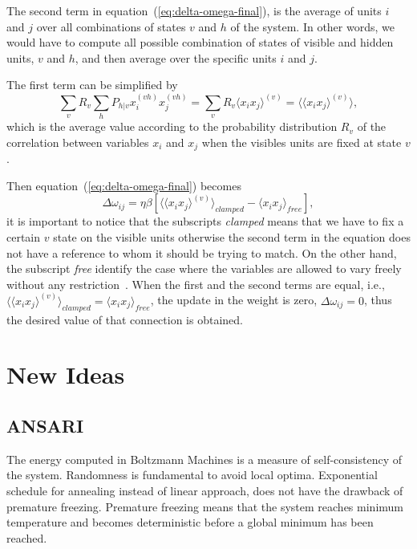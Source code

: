 The second term in equation~(\ref{eq:delta-omega-final}), is the average of units $i$ and $j$ over all combinations of states $v$ and $h$ of the system.
In other words, we would have to compute all possible combination of states of visible and hidden units, $v$ and $h$, and then average over the specific units $i$ and $j$.

The first term can be simplified by
\begin{equation}
  \label{eq:clamped-term}
  \sum_{v} R_{v} \sum_{h} P_{h|v} x^{(vh)}_{i} x^{(vh)}_{j} = \sum_{v} R_{v} \langle x_{i} x_{j} \rangle^{(v)} = \langle \langle x_{i} x_{j} \rangle^{(v)} \rangle,
\end{equation}
which is the average value according to the probability distribution $R_{v}$ of the correlation between variables $x_{i}$ and $x_{j}$ when the visibles units are fixed at state $v$.

Then equation~(\ref{eq:delta-omega-final}) becomes
\begin{equation}
  \label{eq:delta-omega-final2}
  \Delta \omega_{ij} = \eta \beta \left[ \langle \langle x_{i} x_{j} \rangle^{(v)} \rangle_{clamped} - \langle x_{i} x_{j} \rangle_{free} \right],
\end{equation}
it is important to notice that the subscripts \textit{clamped} means that we have to fix a certain $v$ state on the visible units otherwise the second term in the equation does not have a reference to whom it should be trying to match.
On the other hand, the subscript \textit{free} identify the case where the variables are allowed to vary freely without any restriction~\cite{bib:duda2000}. When the first and the second terms are equal, i.e., $\langle \langle x_{i} x_{j} \rangle^{(v)} \rangle_{clamped} = \langle x_{i} x_{j} \rangle_{free}$, the update in the weight is zero, $\Delta \omega_{ij} = 0$, thus the desired value of that connection is obtained.



\section{New Ideas}
\subsection{ANSARI}

The energy computed in Boltzmann Machines is a measure of self-consistency of the system. 
Randomness is fundamental to avoid local optima.
Exponential schedule for annealing instead of linear approach, does not have the drawback of premature freezing. 
Premature freezing means that the system reaches minimum temperature and becomes deterministic before a global minimum has been reached.


